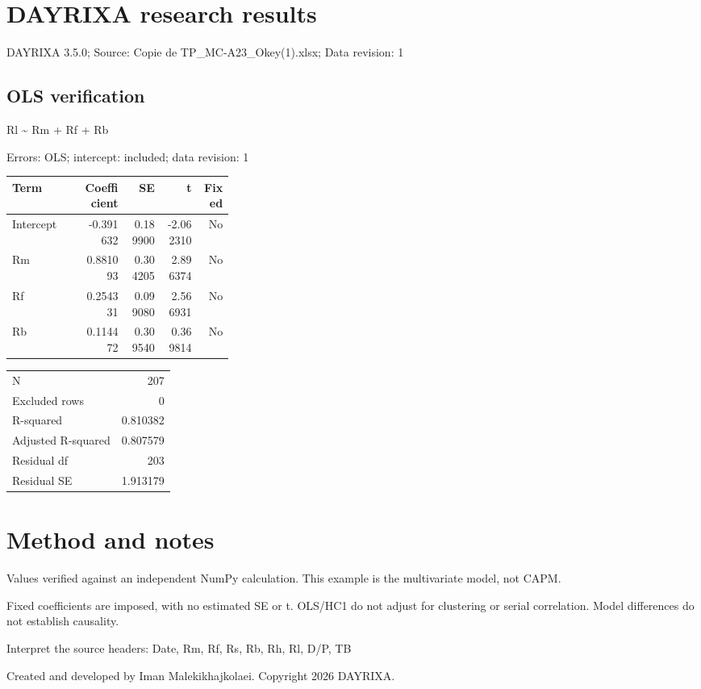 \documentclass[11pt]{article}
\begin{document}
\raggedright
\section*{DAYRIXA research results}
DAYRIXA 3.5.0; Source: Copie de TP\_MC-A23\_Okey(1).xlsx; Data revision: 1\par
\subsection*{OLS verification}
Rl \textasciitilde{} Rm + Rf + Rb\par
Errors: OLS; intercept: included; data revision: 1\par
\begin{longtable}{p{0.32\linewidth}rrrr}
Term & Coefficient & SE & t & Fixed \\ \hline
Intercept & -0.391632 & 0.189900 & -2.062310 & No \\
Rm & 0.881093 & 0.304205 & 2.896374 & No \\
Rf & 0.254331 & 0.099080 & 2.566931 & No \\
Rb & 0.114472 & 0.309540 & 0.369814 & No \\
\end{longtable}
\begin{tabular}{lr}
N & 207 \\
Excluded rows & 0 \\
R-squared & 0.810382 \\
Adjusted R-squared & 0.807579 \\
Residual df & 203 \\
Residual SE & 1.913179 \\
\end{tabular}\par
\section*{Method and notes}
Values verified against an independent NumPy calculation. This example is the multivariate model, not CAPM.\par
Fixed coefficients are imposed, with no estimated SE or t. OLS/HC1 do not adjust for clustering or serial correlation. Model differences do not establish causality.\par
Interpret the source headers: Date, Rm, Rf, Rs, Rb, Rh, Rl, D/P, TB\par
\par
\small Created and developed by Iman Malekikhajkolaei. Copyright 2026 DAYRIXA.
\end{document}

